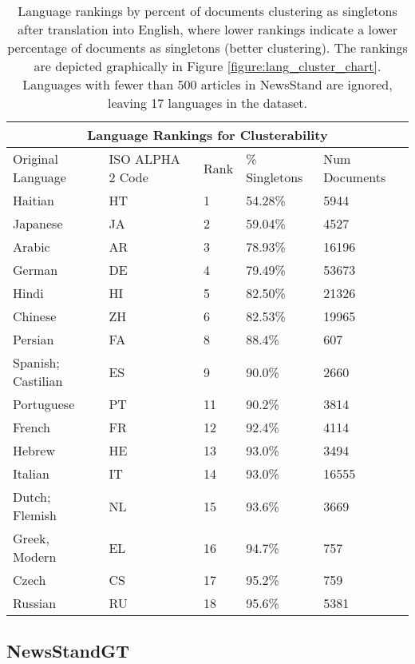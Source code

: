\begin{table*}[ht!]
\begin{tabular}{ |p{3cm}||p{2.5cm}|p{1cm}|p{2cm}|p{2.5cm}||  }
 \hline
 \multicolumn{5}{|c|}{Language Rankings for Clusterability} \\
 \hline
 Original Language & ISO ALPHA 2 Code & Rank & \% Singletons & Num Documents\\
 \hline
 Haitian   & HT    & 1 & 54.28\% & 5944\\
 Japanese &   JA  &  2 & 59.04\% & 4527\\
 Arabic & AR & 3 & 78.93\% & 16196\\
 German & DE & 4 & 79.49\% & 53673\\
 Hindi &   HI  & 5 & 82.50\% & 21326\\
 Chinese & ZH  & 6 & 82.53\% & 19965\\
 Persian & FA & 8 & 88.4\% & 607\\
 Spanish; Castilian & ES & 9 & 90.0\% & 2660\\
 Portuguese & PT & 11 & 90.2\% & 3814\\
 French & FR & 12 & 92.4\% & 4114\\
 Hebrew & HE & 13 & 93.0\% & 3494\\
 Italian & IT & 14 & 93.0\% & 16555\\
 Dutch; Flemish & NL & 15 & 93.6\% & 3669\\
 Greek, Modern & EL & 16 & 94.7\% & 757\\
 Czech & CS & 17 & 95.2\% & 759\\
 Russian & RU & 18 & 95.6\% & 5381\\
 \hline
\end{tabular}
\caption{ Language rankings by percent of documents clustering as singletons after translation into English, where lower rankings indicate a lower percentage of documents as singletons (better clustering). The rankings are depicted graphically in Figure \ref{figure:lang_cluster_chart}. Languages with fewer than 500 articles in NewsStand are ignored, leaving 17 languages in the dataset.}
\label{table:newsstandlarge-stats}
\end{table*}





\subsection{NewsStandGT}


